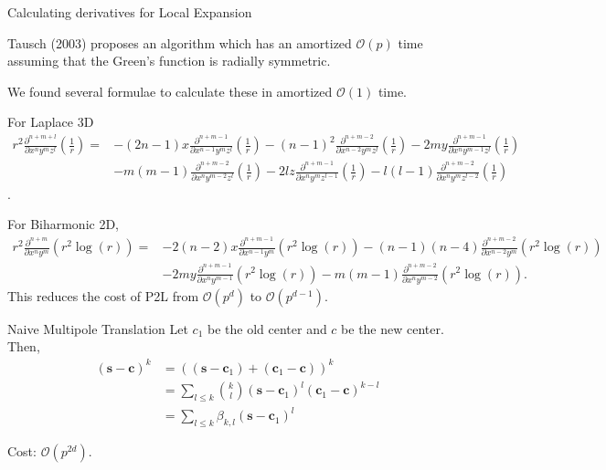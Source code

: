 \documentclass[10pt,usenames,dvipsnames]{beamer}
\def\b#1{\mathbf{ #1}}
\begin{document}
\begin{frame}[fragile]{Calculating derivatives for Local Expansion}

Tausch (2003) proposes an algorithm which has an amortized $\mathcal{O}(p)$ time
assuming that the Green's function is radially symmetric.

We found several formulae to calculate these in amortized $\mathcal{O}(1)$ time.

For Laplace 3D
\tiny
\begin{align*}
    r^2 \frac{\partial^{n+m+l}}{\partial x^{n} y^m z^l} \left(\frac{1}{r}\right) =
              & -(2n-1)x \frac{\partial^{n+m-1}}{\partial x^{n-1} y^m z^l} \left(\frac{1}{r}\right)
              - (n-1)^2 \frac{\partial^{n+m-2}}{\partial x^{n-2}y^m z^l} \left(\frac{1}{r}\right)
              - 2m y \frac{\partial^{n+m-1}}{\partial x^{n} y^{m-1} z^l} \left(\frac{1}{r}\right) \\
              &- m(m-1) \frac{\partial^{n+m-2}}{\partial x^{n} y^{m-2} z^l} \left(\frac{1}{r}\right)
              - 2l z \frac{\partial^{n+m-1}}{\partial x^{n} y^{m} z^{l-1}} \left(\frac{1}{r}\right)
              - l(l-1) \frac{\partial^{n+m-2}}{\partial x^{n} y^{m} z^{l-2}} \left(\frac{1}{r}\right)
\end{align*}.

\normalsize
For Biharmonic 2D,
\tiny
\begin{align*}
    r^2 \frac{\partial^{n+m}}{\partial x^{n}y^m} \left(r^2 \log(r)\right) = &
               -2(n-2)x \frac{\partial^{n+m-1}}{\partial x^{n-1}y^m} \left(r^2 \log(r)\right)
               -(n-1)(n-4) \frac{\partial^{n+m-2}}{\partial x^{n-2}y^m} \left(r^2 \log(r)\right) \\
               &-2 m y\frac{\partial^{n+m-1}}{\partial x^{n}y^{m-1}} \left(r^2 \log(r)\right)
               -m(m-1) \frac{\partial^{n+m-2}}{\partial x^{n}y^{m-2}} \left(r^2 \log(r)\right).
\end{align*}
\normalsize
This reduces the cost of P2L from $\mathcal{O}(p^d)$ to $\mathcal{O}(p^{d-1})$.

\end{frame}

\begin{frame}[fragile]{Naive Multipole Translation}
Let $c_1$ be the old center and $c$ be the new center. Then,
\begin{align*}
(\b s-\b c)^k &= \left(\left(\b s-\b c_1\right) + \left(\b c_1-\b c\right)\right)^k   \\
&= \sum_{l \le k} \binom{k}{l}\left(\b s-\b c_1\right)^l \left(\b c_1-\b c\right)^{k-l} \\
&= \sum_{l \le k} \beta_{k, l}\left(\b s-\b c_1\right)^l
\end{align*}

Cost: $\mathcal{O}(p^{2d})$.

\end{frame}
\end{document}
